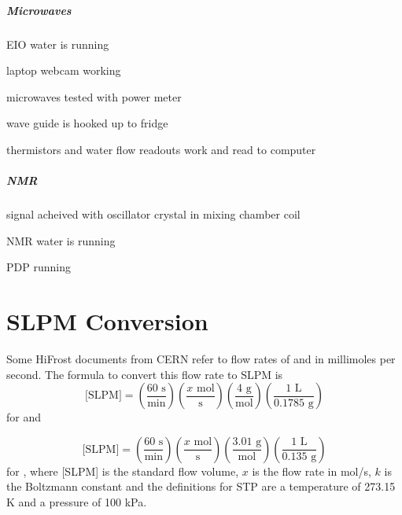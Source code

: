 \begin{appendices}
\begin{minipage}{\textwidth}
\paragraph{Microwaves}
\begin{checklist}
 \item EIO water is running
 \item laptop webcam working
 \item microwaves tested with power meter
 \item wave guide is hooked up to fridge
 \item thermistors and water flow readouts work and read to computer
\end{checklist}
\end{minipage}

\begin{minipage}{\textwidth}
\paragraph{NMR}
\begin{checklist}
 \item signal acheived with oscillator crystal in mixing chamber coil
 \item NMR water is running
 \item PDP running
\end{checklist}
\end{minipage}

\chapter{SLPM Conversion}
\label{appendix:slpm-conversion}
Some HiFrost documents from CERN refer to flow rates of \hef{} and \het{} in millimoles per second.  The formula to convert this flow rate to SLPM is
\begin{equation}
 \textrm{[SLPM]}=\left(\frac{60\textrm{ s}}{\textrm{min}}\right)\left(\frac{x\textrm{ mol}}{\textrm{s}}\right)\left(\frac{4\textrm{ g}}{\textrm{mol}}\right)\left(\frac{1\textrm{ L}}{0.1785\textrm{ g}}\right)
\end{equation}
for \hef{} and 

\begin{equation}
 \textrm{[SLPM]}=\left(\frac{60\textrm{ s}}{\textrm{min}}\right)\left(\frac{x\textrm{ mol}}{\textrm{s}}\right)\left(\frac{3.01\textrm{ g}}{\textrm{mol}}\right)\left(\frac{1\textrm{ L}}{0.135\textrm{ g}}\right)
\end{equation}
for \het{}\cite{linde-helium-3-sheet}, where [SLPM] is the standard flow volume, $x$ is the flow rate in mol/s, $k$ is the Boltzmann constant and the definitions for STP are a temperature of 273.15 K and a pressure of 100 kPa.


\end{appendices}

